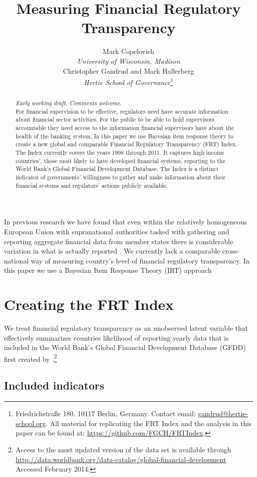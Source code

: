\documentclass[a4paper]{article}
\title{Measuring Financial Regulatory Transparency}
\author{Mark Copelovich \\ \emph{University of Wisconsin, Madison} \\[0.5cm] Christopher Gandrud and Mark Hallerberg \\ 
    {\emph{Hertie School of Governance}}\footnote{Friedrichstra{\ss}e 180. 10117 Berlin, Germany. Contact email: \href{mailto:gandrud@hertie-school.org}{gandrud@hertie-school.org}. All material for replicating the FRT Index and the analysis in this paper can be found at: \url{https://github.com/FGCH/FRTIndex}.}}
\begin{document}
\maketitle

\begin{abstract}
\noindent \emph{Early working draft. Comments welcome.} \\
For financial supervision to be effective, regulators need have accurate information about financial sector activities. For the public to be able to hold supervisors accountable they need access to the information financial supervisors have about the health of the banking system. In this paper we use Bayesian item response theory to create a new global and comparable Financial Regulatory Transparency (FRT) Index. The Index currently covers the years 1998 through 2011. It captures high income countries', those most likely to have developed financial systems, reporting to the World Bank's Global Financial Development Database. The Index is a distinct indicator of governments' willingness to gather and make information about their financial systems and regulators' actions publicly available. 
\end{abstract}

In previous research we have found that even within the relatively homogeneous European Union with supranational authorities tasked with gathering and reporting aggregate financial data from member states there is considerable variation in what is actually reported \cite[see][]{Gandrud2014a}. We currently lack a comparable cross-national way of measuring country's level of financial regulatory transparency. In this paper we use a Bayesian Item Response Theory (IRT) approach

\section{Creating the FRT Index}

We treat financial regulatory transparency as an unobserved latent variable that effectively summarizes countries likelihood of reporting yearly data that is included in the World Bank's Global Financial Development Database (GFDD) first created by \cite{Cihak2012}.\footnote{Access to the most updated version of the data set is available through \url{http://data.worldbank.org/data-catalog/global-financial-development} Accessed February 2014.}

\subsection{Included indicators}
\end{document}
